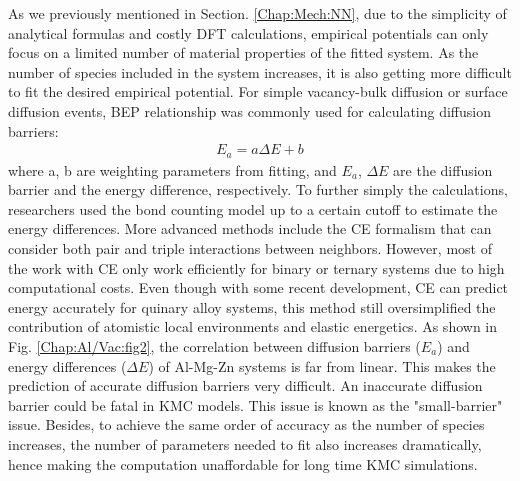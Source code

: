 As we previously mentioned in Section. \ref{Chap:Mech:NN}, due to the simplicity of analytical formulas and costly \ac{DFT} calculations, empirical potentials can only focus on a limited number of material properties of the fitted system. As the number of species included in the system increases, it is also getting more difficult to fit the desired empirical potential. For simple vacancy-bulk diffusion or surface diffusion events, \acf{BEP} relationship \cite{bronsted1924katalytische, evans1936further, bell1936theory} was commonly used for calculating diffusion barriers:
\begin{subequations}
\begin{align}
E_a = a \Delta E + b
\label{Chap:Al/Vac:eq:BEP}
\end{align}
\end{subequations}
where a, b are weighting parameters from fitting, and $E_a$, $\Delta E$ are the diffusion barrier and the energy difference, respectively. To further simply the calculations, researchers used the bond counting model up to a certain cutoff to estimate the energy differences. \cite{soisson1996monte, soisson2010atomistic} More advanced methods include the \acf{CE} formalism that can consider both pair and triple interactions between neighbors. \cite{sanchez1984generalized,zunger1994statics,van2001first,persson2010lj,natarajan2016early} However, most of the work with \ac{CE} only work efficiently for binary or ternary systems due to high computational costs. \cite{wu2016cluster} Even though with some recent development\cite{nguyen2017cluster}, \ac{CE} can predict energy accurately for quinary alloy systems, this method still oversimplified the contribution of atomistic local environments and elastic energetics. As shown in Fig. \ref{Chap:Al/Vac:fig2}, the correlation between diffusion barriers ($E_a$) and energy differences ($\Delta E$) of Al-Mg-Zn systems is far from linear. This makes the prediction of accurate diffusion barriers very difficult. An inaccurate diffusion barrier could be fatal in \ac{KMC} models. This issue is known as the "small-barrier" issue. \cite{miron2004multiple} Besides, to achieve the same order of accuracy as the number of species increases, the number of parameters needed to fit also increases dramatically\cite{castin2008use}, hence making the computation unaffordable for long time \ac{KMC} simulations.


